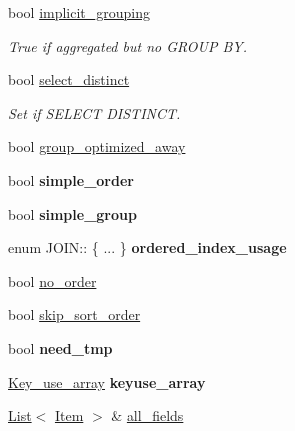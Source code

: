 \begin{DoxyCompactItemize}
\mbox{\label{classJOIN_ac6a0d71ac6c3a9e02df48057d633a415}} 
bool \mbox{\hyperlink{classJOIN_ac6a0d71ac6c3a9e02df48057d633a415}{implicit\+\_\+grouping}}
\begin{DoxyCompactList}\small\item\em True if aggregated but no G\+R\+O\+UP BY. \end{DoxyCompactList}\item 
\mbox{\label{classJOIN_a4526a3c9814896f2f91a656c2a0a9326}} 
bool \mbox{\hyperlink{classJOIN_a4526a3c9814896f2f91a656c2a0a9326}{select\+\_\+distinct}}
\begin{DoxyCompactList}\small\item\em Set if S\+E\+L\+E\+CT D\+I\+S\+T\+I\+N\+CT. \end{DoxyCompactList}\item 
bool \mbox{\hyperlink{classJOIN_ac1f17fa2397efcd2f1c9fd378ac991b6}{group\+\_\+optimized\+\_\+away}}
\item 
\mbox{\label{classJOIN_a4db755c5e40a9e7ef838b00b590aa848}} 
bool {\bfseries simple\+\_\+order}
\item 
\mbox{\label{classJOIN_afce5441711efcb3602f122d95db36d26}} 
bool {\bfseries simple\+\_\+group}
\item 
\mbox{\label{classJOIN_af629440a422e975f9c6b9329861d6584}} 
enum J\+O\+I\+N\+:: \{ ... \}  {\bfseries ordered\+\_\+index\+\_\+usage}
\item 
bool \mbox{\hyperlink{classJOIN_a344b18fe9de3b8ca73352e0f662595f8}{no\+\_\+order}}
\item 
bool \mbox{\hyperlink{classJOIN_a02bbd306d5b25097db48b42b1a70e1b1}{skip\+\_\+sort\+\_\+order}}
\item 
\mbox{\label{classJOIN_a17915056890671d0238eb13b45747a73}} 
bool {\bfseries need\+\_\+tmp}
\item 
\mbox{\label{classJOIN_a974d5a40e96eee336a9d303105c3e5fe}} 
\mbox{\hyperlink{classMem__root__array}{Key\+\_\+use\+\_\+array}} {\bfseries keyuse\+\_\+array}
\item 
\mbox{\hyperlink{classList}{List}}$<$ \mbox{\hyperlink{classItem}{Item}} $>$ \& \mbox{\hyperlink{classJOIN_a6664196553f3202cfc4e740358d6bc0d}{all\+\_\+fields}}

\end{DoxyCompactItemize}
